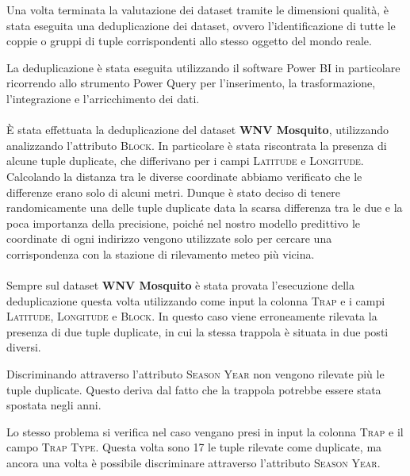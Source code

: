 Una volta terminata la valutazione dei dataset tramite le dimensioni qualità, è stata eseguita una deduplicazione dei dataset, ovvero l'identificazione di tutte le coppie o gruppi di tuple corrispondenti allo stesso oggetto del mondo reale.

La deduplicazione è stata eseguita utilizzando il software Power BI in particolare ricorrendo allo strumento Power Query per l'inserimento, la trasformazione, l'integrazione e l'arricchimento dei dati.
\\\\	
È stata effettuata la deduplicazione del dataset \textbf{WNV Mosquito}, utilizzando analizzando l'attributo \textsc{Block}. In particolare è stata riscontrata la presenza di alcune tuple duplicate, che differivano per i campi \textsc{Latitude} e \textsc{Longitude}. Calcolando la distanza tra le diverse coordinate abbiamo verificato che le differenze erano solo di alcuni metri.
Dunque è stato deciso di tenere randomicamente una delle tuple duplicate data la scarsa differenza tra le due e la poca importanza della precisione, poiché nel nostro modello predittivo le coordinate di ogni indirizzo vengono utilizzate solo per cercare una corrispondenza con la stazione di rilevamento meteo più vicina.
\\\\
Sempre sul dataset \textbf{WNV Mosquito} è stata provata l'esecuzione della deduplicazione questa volta utilizzando come input la colonna \textsc{Trap} e i campi \textsc{Latitude}, \textsc{Longitude} e \textsc{Block}. In questo caso viene erroneamente rilevata la presenza di due tuple duplicate, in cui la stessa trappola è situata in due posti diversi. 

Discriminando attraverso l'attributo \textsc{Season Year} non vengono rilevate più le tuple duplicate. Questo deriva dal fatto che la trappola potrebbe essere stata spostata negli anni.

Lo stesso problema si verifica nel caso vengano presi in input la colonna \textsc{Trap} e il campo \textsc{Trap Type}. Questa volta sono 17 le tuple rilevate come duplicate, ma ancora una volta è possibile discriminare attraverso l'attributo \textsc{Season Year}.
